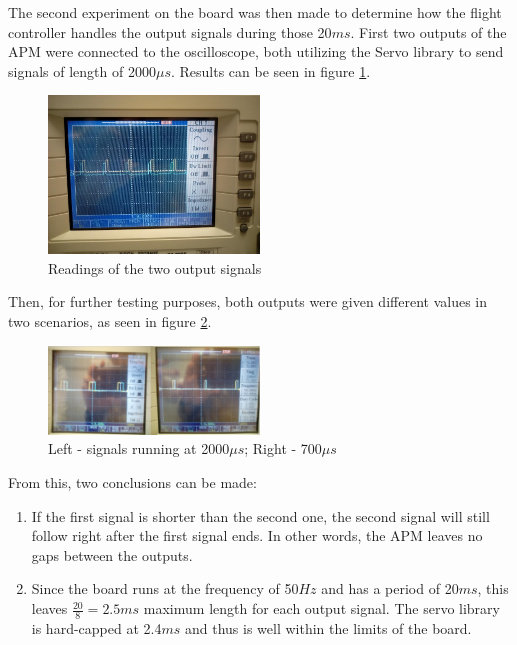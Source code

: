 The second experiment on the board was then made to determine how the flight controller handles the output signals during those 20$ms$. First two outputs of the APM were connected to the oscilloscope, both utilizing the Servo library to send signals of length of 2000$\mu s$. Results can be seen in figure \ref{oscillo2}.
\begin{figure}[H]
  \centering
    \includegraphics[width=0.5\textwidth]{images/oscillo2.jpg}
	\caption{Readings of the two output signals}
	\label{oscillo2}
\end{figure}

Then, for further testing purposes, both outputs were given different values in two scenarios, as seen in figure \ref{oscillo3}.

\begin{figure}[H]
  \centering
    \includegraphics[width=0.5\textwidth]{images/oscillo3.png}
	\caption{Left - signals running at 2000$\mu s$; Right - 700$\mu s$}
	\label{oscillo3}
\end{figure}

From this, two conclusions can be made:
\begin{enumerate}
\item If the first signal is shorter than the second one, the second signal will still follow right after the first signal ends. In other words, the APM leaves no gaps between the outputs.
\item Since the board runs at the frequency of 50$Hz$ and has a period of 20$ms$, this leaves $\frac{20}{8} = 2.5ms$ maximum length for each output signal. The servo library is hard-capped at 2.4$ms$ and thus is well within the limits of the board.
\end{enumerate}

